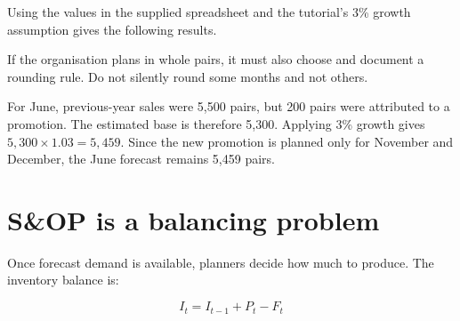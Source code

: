 Using the values in the supplied spreadsheet and the tutorial's 3\% growth assumption gives the following results.

\begin{erptable}
\end{erptable}

If the organisation plans in whole pairs, it must also choose and document a rounding rule. Do not silently round some months and not others.

\begin{workedexample}
For June, previous-year sales were 5,500 pairs, but 200 pairs were attributed to a promotion. The estimated base is therefore 5,300. Applying 3\% growth gives $5{,}300\times 1.03=5{,}459$. Since the new promotion is planned only for November and December, the June forecast remains 5,459 pairs.
\end{workedexample}

\section{S\&OP is a balancing problem}

Once forecast demand is available, planners decide how much to produce. The inventory balance is:

\[
I_t = I_{t-1} + P_t - F_t
\]

